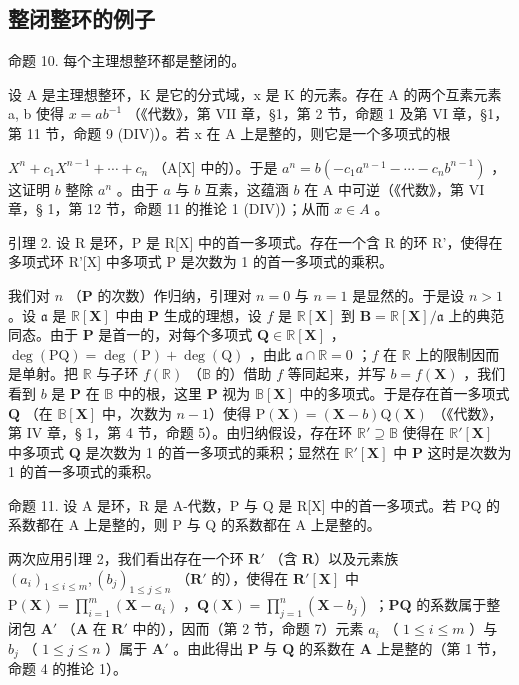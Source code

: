 \subsection{整闭整环的例子}

命题 10. 每个主理想整环都是整闭的。\par

设 A 是主理想整环，K 是它的分式域，x 是 K 的元素。存在 A 的两个互素元素 a, b 使得 \(x = ab^{-1}\) （《代数》，第 VII 章，§1，第 2 节，命题 1 及第 VI 章，§1，第 11 节，命题 9 (DIV)）。若 x 在 A 上是整的，则它是一个多项式的根

\(X^{n} + c_{1}X^{n-1} + \cdots + c_{n}\) （A{[}X{]} 中的）。于是 \(a^{n} = b(-c_{1}a^{n-1} - \cdots - c_{n}b^{n-1})\) ，这证明 \(b\) 整除 \(a^{n}\) 。由于 \(a\) 与 \(b\) 互素，这蕴涵 \(b\) 在 A 中可逆（《代数》，第 VI 章，§ 1，第 12 节，命题 11 的推论 1 (DIV)）；从而 \(x \in A\) 。

引理 2. 设 R 是环，P 是 R{[}X{]} 中的首一多项式。存在一个含 R 的环 R'，使得在多项式环 R'{[}X{]} 中多项式 P 是次数为 1 的首一多项式的乘积。

我们对 \(n\) （\(\mathbf{P}\) 的次数）作归纳，引理对 \(n = 0\) 与 \(n = 1\) 是显然的。于是设 \(n > 1\) 。设 \(\mathfrak{a}\) 是 \(\mathbb{R}[\mathbf{X}]\) 中由 \(\mathbf{P}\) 生成的理想，设 \(f\) 是 \(\mathbb{R}[\mathbf{X}]\) 到 \(\mathbf{B} = \mathbb{R}[\mathbf{X}] / \mathfrak{a}\) 上的典范同态。由于 \(\mathbf{P}\) 是首一的，对每个多项式 \(\mathbf{Q} \in \mathbb{R}[\mathbf{X}]\) ，\(\deg(\mathrm{PQ}) = \deg(\mathrm{P}) + \deg(\mathrm{Q})\) ，由此 \(\mathfrak{a} \cap \mathbb{R} = 0\) ；\(f\) 在 \(\mathbb{R}\) 上的限制因而是单射。把 \(\mathbb{R}\) 与子环 \(f(\mathbb{R})\) （\(\mathbb{B}\) 的）借助 \(f\) 等同起来，并写 \(b = f(\mathbf{X})\) ，我们看到 \(b\) 是 \(\mathbf{P}\) 在 \(\mathbb{B}\) 中的根，这里 \(\mathbf{P}\) 视为 \(\mathbb{B}[\mathbf{X}]\) 中的多项式。于是存在首一多项式 \(\mathbf{Q}\) （在 \(\mathbb{B}[\mathbf{X}]\) 中，次数为 \(n - 1\)）使得 \(\mathrm{P}(\mathbf{X}) = (\mathbf{X} - b)\mathrm{Q}(\mathbf{X})\) （《代数》，第 IV 章，§ 1，第 4 节，命题 5）。由归纳假设，存在环 \(\mathbb{R}' \supseteq \mathbb{B}\) 使得在 \(\mathbb{R}'[\mathbf{X}]\) 中多项式 \(\mathbf{Q}\) 是次数为 1 的首一多项式的乘积；显然在 \(\mathbb{R}'[\mathbf{X}]\) 中 \(\mathbf{P}\) 这时是次数为 1 的首一多项式的乘积。

命题 11. 设 A 是环，R 是 A-代数，P 与 Q 是 R{[}X{]} 中的首一多项式。若 PQ 的系数都在 A 上是整的，则 P 与 Q 的系数都在 A 上是整的。

两次应用引理 2，我们看出存在一个环 \(\mathbf{R}'\) （含 \(\mathbf{R}\)）以及元素族 \((a_i)_{1 \leqslant i \leqslant m}, (b_j)_{1 \leqslant j \leqslant n}\) （\(\mathbf{R}'\) 的），使得在 \(\mathbf{R}'[\mathbf{X}]\) 中 \(\mathrm{P}(\mathbf{X}) = \prod_{i=1}^{m} (\mathbf{X} - a_i)\) ，\(\mathbf{Q}(\mathbf{X}) = \prod_{j=1}^{n} (\mathbf{X} - b_j)\) ；\(\mathbf{PQ}\) 的系数属于整闭包 \(\mathbf{A}'\) （\(\mathbf{A}\) 在 \(\mathbf{R}'\) 中的），因而（第 2 节，命题 7）元素 \(a_i\) （ \(1 \leqslant i \leqslant m\) ）与 \(b_j\) （ \(1 \leqslant j \leqslant n\) ）属于 \(\mathbf{A}'\) 。由此得出 \(\mathbf{P}\) 与 \(\mathbf{Q}\) 的系数在 \(\mathbf{A}\) 上是整的（第 1 节，命题 4 的推论 1）。

